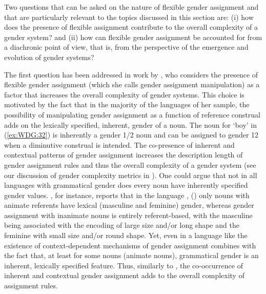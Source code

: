 \documentclass[output=collectionpaper]{langsci/langscibook}
\begin{document}
Two questions that can be asked on the nature of flexible gender assignment and that are particularly relevant to the topics discussed in this section are: (i) how does the presence of flexible assignment contribute to the overall complexity of a gender system? and (ii) how can flexible gender assignment be accounted for from a diachronic point of view, that is, from the perspective of the emergence and evolution of gender systems?

The first question has been addressed in work by \cite{DiGarbo2014,DiGarbo2016}, who considers the presence of flexible gender assignment (which she calls gender assignment manipulation) as a factor that increases the overall complexity of gender systems. This choice is motivated by the fact that in the majority of the languages of her sample, the possibility of manipulating gender assignment as a function of reference construal adds on the lexically specified, inherent, gender of a noun. The noun for `boy' in  (\ref{ex:WDG:32}) is inherently a gender 1/2 noun and can be assigned to gender 12 when a diminutive construal is intended. The co-presence of inherent and contextual patterns of gender assignment increases the description length of gender assignment rules and thus the overall complexity of a gender system (see our discussion of gender complexity metrics in ). One could argue that not in all languages with grammatical gender does every noun have inherently specified gender values. \cite[42]{Aikhenvald2012}, for instance, reports that in the  language , () only nouns with animate referents have lexical (masculine and feminine) gender, whereas gender assignment with inanimate nouns is entirely referent-based, with the masculine being associated with the encoding of large size and/or long shape and the feminine with small size and/or round shape. Yet, even in a language like  the existence of context-dependent mechanisms of gender assignment combines with the fact that, at least for some nouns (animate nouns), grammatical gender is an inherent, lexically specified feature. Thus, similarly to , the co-occurrence of inherent and contextual gender assignment adds to the overall complexity of assignment rules.
\end{document}
